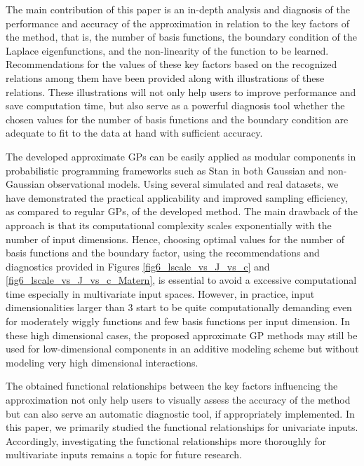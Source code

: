 \documentclass[onecolumn,a4paper,11pt]{article}
\begin{document}

The main contribution of this paper is an in-depth analysis and diagnosis of the performance and accuracy of the approximation in relation to the key factors of the method, that is, the number of basis functions, the boundary condition of the Laplace eigenfunctions, and the non-linearity of the function to be learned. Recommendations for the values of these key factors based on the recognized relations among them have been provided along with illustrations of these relations. These illustrations will not only help users to improve performance and save computation time, but also serve as a powerful diagnosis tool whether the chosen values for the number of basis functions and the boundary condition are adequate to fit to the data at hand with sufficient accuracy.

The developed approximate GPs can be easily applied as modular components in probabilistic programming frameworks such as Stan in both Gaussian and non-Gaussian observational models. Using several simulated and real datasets, we have demonstrated the practical applicability and improved sampling efficiency, as compared to regular GPs, of the developed method.
The main drawback of the approach is that its computational complexity scales exponentially with the number of input dimensions. Hence, choosing optimal values for the number of basis functions and the boundary factor, using the
 recommendations and diagnostics provided in Figures \ref{fig6_lscale_vs_J_vs_c} and \ref{fig6_lscale_vs_J_vs_c_Matern}, is essential to avoid a excessive computational time especially in multivariate input spaces. However, in practice, input dimensionalities larger than 3 start to be quite computationally demanding even for moderately wiggly functions and few basis functions per input dimension. In these high dimensional cases, the proposed approximate GP methods may still be used for low-dimensional components in an additive modeling scheme but without modeling very high dimensional interactions.

The obtained functional relationships between the key factors influencing the approximation not only help users to visually assess the accuracy of the method
but can also serve an automatic diagnostic tool, if appropriately implemented.
In this paper, we primarily studied the functional relationships for univariate inputs. Accordingly, investigating the functional relationships more thoroughly for multivariate inputs remains a topic for future research. 
\end{document}
